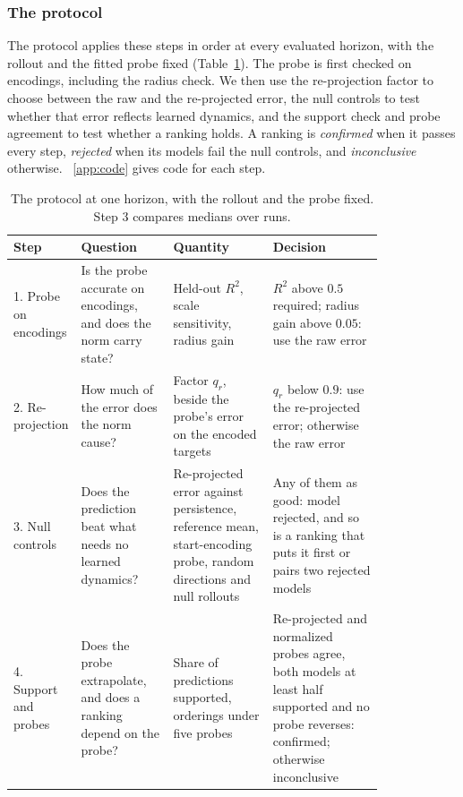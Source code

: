 \subsubsection{The protocol}
\label{sec:decision}
The protocol applies these steps in order at every evaluated horizon, with the rollout and the fitted probe fixed (Table~\ref{tab:terms}). The probe is first checked on encodings, including the radius check. We then use the re-projection factor to choose between the raw and the re-projected error, the null controls to test whether that error reflects learned dynamics, and the support check and probe agreement to test whether a ranking holds. A ranking is \emph{confirmed} when it passes every step, \emph{rejected} when its models fail the null controls, and \emph{inconclusive} otherwise. \supsec~\ref{app:code} gives code for each step.

\begin{table}[tb]
\caption{The protocol at one horizon, with the rollout and the probe fixed. Step 3 compares medians over runs.}
\label{tab:terms}
\centering\footnotesize
\begin{tabular}{@{}l>{\raggedright\arraybackslash}p{0.25\linewidth}>{\raggedright\arraybackslash}p{0.27\linewidth}>{\raggedright\arraybackslash}p{0.3\linewidth}@{}}
\toprule
Step & Question & Quantity & Decision \\
\midrule
1. Probe on encodings & Is the probe accurate on encodings, and does the norm carry state? & Held-out $R^2$, scale sensitivity, radius gain & $R^2$ above $0.5$ required; radius gain above $0.05$: use the raw error \\
2. Re-projection & How much of the error does the norm cause? & Factor $q_r$, beside the probe's error on the encoded targets & $q_r$ below $0.9$: use the re-projected error; otherwise the raw error \\
3. Null controls & Does the prediction beat what needs no learned dynamics? & Re-projected error against persistence, reference mean, start-encoding probe, random directions and null rollouts & Any of them as good: model rejected, and so is a ranking that puts it first or pairs two rejected models \\
4. Support and probes & Does the probe extrapolate, and does a ranking depend on the probe? & Share of predictions supported, orderings under five probes & Re-projected and normalized probes agree, both models at least half supported and no probe reverses: confirmed; otherwise inconclusive \\
\bottomrule
\end{tabular}
\end{table}

